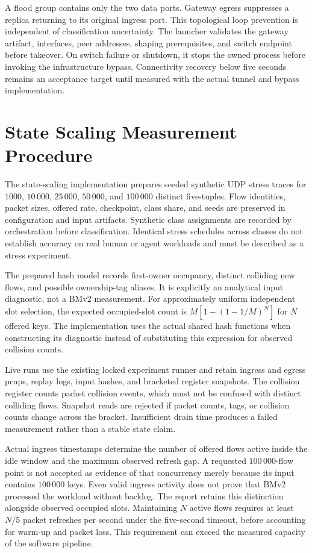 A flood group contains only the two data ports. Gateway egress suppresses a replica
returning to its original ingress port. This topological loop prevention is independent
of classification uncertainty. The launcher validates the gateway artifact, interfaces,
peer addresses, shaping prerequisites, and switch endpoint before takeover. On switch
failure or shutdown, it stops the owned process before invoking the infrastructure
bypass. Connectivity recovery below five seconds remains an acceptance target until
measured with the actual tunnel and bypass implementation.

\section{State Scaling Measurement Procedure}
\label{sec:state-scaling-procedure}

The state-scaling implementation prepares seeded synthetic UDP stress traces for
$1000$, $10\,000$, $25\,000$, $50\,000$, and $100\,000$ distinct five-tuples. Flow identities,
packet sizes, offered rate, checkpoint, class share, and seeds are preserved in configuration
and input artifacts. Synthetic class assignments are recorded by orchestration before
classification. Identical stress schedules across classes do not establish accuracy on
real human or agent workloads and must be described as a stress experiment.

The prepared hash model records first-owner occupancy, distinct colliding new flows,
and possible ownership-tag aliases. It is explicitly an analytical input diagnostic,
not a BMv2 measurement. For approximately uniform independent slot selection, the expected
occupied-slot count is $M[1-(1-1/M)^N]$ for $N$ offered keys. The implementation uses the
actual shared hash functions when constructing its diagnostic instead of substituting
this expression for observed collision counts.

Live runs use the existing locked experiment runner and retain ingress and egress pcaps,
replay logs, input hashes, and bracketed register snapshots. The collision register counts
packet collision events, which must not be confused with distinct colliding flows.
Snapshot reads are rejected if packet counts, tags, or collision counts change across
the bracket. Insufficient drain time produces a failed measurement rather than a stable
state claim.

Actual ingress timestamps determine the number of offered flows active inside the idle
window and the maximum observed refresh gap. A requested $100\,000$-flow point is not
accepted as evidence of that concurrency merely because its input contains $100\,000$
keys. Even valid ingress activity does not prove that BMv2 processed the workload without
backlog. The report retains this distinction alongside observed occupied slots.
Maintaining $N$ active flows requires at least $N/5$ packet refreshes per second under the
five-second timeout, before accounting for warm-up and packet loss. This requirement can
exceed the measured capacity of the software pipeline.


